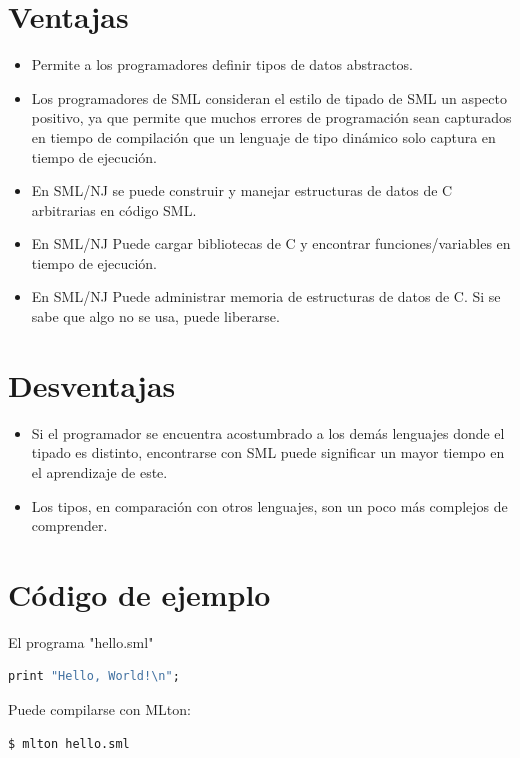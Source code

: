 \documentclass[10pt,journal,compsoc]{IEEEtran}
\begin{document}
\section{Ventajas}
\begin{itemize}
	\item Permite a los programadores definir tipos de datos abstractos.
	\item Los programadores de SML consideran el estilo de tipado de SML un aspecto positivo, ya que permite que muchos errores de programaci\'on sean capturados en tiempo de compilaci\'on que un lenguaje de tipo din\'amico solo captura en tiempo de ejecuci\'on.
	\item En SML/NJ se puede construir y manejar estructuras de datos de C arbitrarias en c\'odigo SML.
	\item En SML/NJ Puede cargar bibliotecas de C y encontrar funciones/variables en tiempo de ejecuci\'on.
	\item En SML/NJ Puede administrar memoria de estructuras de datos de C. Si se sabe que algo no se usa, puede liberarse.
\end{itemize}

\section{Desventajas}
\begin{itemize}
	\item Si el programador se encuentra acostumbrado a los dem\'as lenguajes donde el tipado es distinto, encontrarse con SML puede significar un mayor tiempo en el aprendizaje de este.
	\item Los tipos, en comparaci\'on con otros lenguajes, son un poco m\'as complejos de comprender.
\end{itemize}

\section{C\'odigo de ejemplo}
El programa "hello.sml"

\begin{lstlisting}[language=ML, caption=Ejemplo Hello World]
print "Hello, World!\n";
\end{lstlisting}

Puede compilarse con MLton:

\begin{lstlisting}[language=ML, caption=Compilar Hello World]
$ mlton hello.sml
\end{lstlisting}
\end{document}
